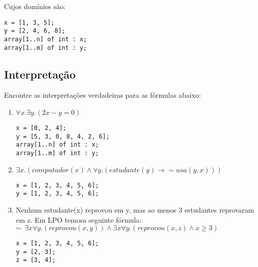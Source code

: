 \documentclass[paper=a4, fontsize=11pt]{scrartcl} %
\numberwithin{equation}{section} %
\numberwithin{figure}{section} %
\numberwithin{table}{section} %
\begin{document}
Cujos domínios são:
\begin{verbatim}
x = [1, 3, 5];
y = [2, 4, 6, 8];
array[1..n] of int : x;
array[1..m] of int : y;
\end{verbatim}

\subsection{Interpretação}

Encontre as interpretações verdadeiras para as fórmulas abaixo:
\begin{enumerate}

\item $\forall x . \exists y .(2x - y = 0)$
\begin{verbatim}
x = [0, 2, 4];
y = [5, 3, 0, 8, 4, 2, 6];
array[1..n] of int : x;
array[1..m] of int : y;
\end{verbatim}

\item $\exists x .(computador(x) \wedge \forall y.(estudante(y) \rightarrow \sim usa(y, x)))$
\begin{verbatim}
x = [1, 2, 3, 4, 5, 6];
y = [1, 2, 3, 4, 5, 6];
\end{verbatim}

\item Nenhum estudante(x) reprovou em y, mas ao menos 3 estudantes reprovaram em z. Em LPO temosa seguinte fórmula:\\

$\sim\:\: \exists x \forall y . (reprovou(x,y)) \land \exists x \forall y .(reprovou(x,z) \land x \ge 3)$

\begin{verbatim}
x = [1, 2, 3, 4, 5, 6];
y = [2, 3]; 
z = [3, 4]; 
\end{verbatim}

\end{enumerate}
\end{document}
